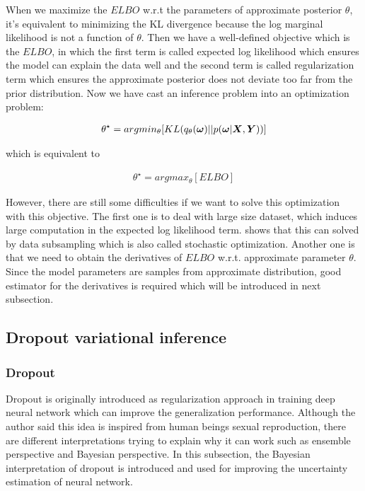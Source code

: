 When we maximize the $ELBO$ w.r.t the parameters of approximate posterior $\theta$, it's equivalent to minimizing the KL divergence because the log marginal likelihood is not a function of $\theta$. Then we have a well-defined objective which is the $ELBO$, in which the first term is called expected log likelihood which ensures the model can explain the data well and the second term is called regularization term which ensures the approximate posterior does not deviate too far from the prior distribution.
Now we have cast an inference problem into an optimization problem:

\begin{equation}\label{2.8}	
\begin{aligned}
\theta^{\star} = argmin_{\theta} [KL(q_{\theta}(\boldsymbol \omega)||p(\boldsymbol \omega | \boldsymbol X, \boldsymbol Y))]
\end{aligned}
\end{equation}

which is equivalent to 

\begin{equation}\label{2.9}	
\begin{aligned}
\theta^{\star} = argmax_{\theta} [ELBO]
\end{aligned}
\end{equation}

However, there are still some difficulties if we want to solve this optimization with this objective. The first one is to deal with large size dataset, which induces large computation in the expected log likelihood term. \cite{graves2011practical} shows that this can solved by data subsampling which is also called stochastic optimization. Another one is that we need to obtain the derivatives of $ELBO$ w.r.t. approximate parameter $\theta$. Since the model parameters are samples from approximate distribution, good estimator for the derivatives is required which will be introduced in next subsection. 


\subsection{Dropout variational inference}
\subsubsection{Dropout}
Dropout\cite{srivastava2014dropout} is originally introduced as regularization approach in training deep neural network which can improve the generalization performance. Although the author said this idea is inspired from human beings sexual reproduction, there are different interpretations trying to explain why it can work such as ensemble perspective and Bayesian perspective. In this subsection, the Bayesian interpretation of dropout is introduced and used for improving the uncertainty estimation of neural network. 


